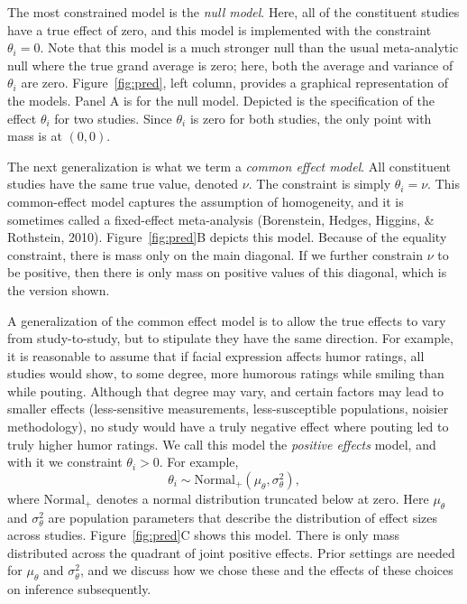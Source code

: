 \documentclass[english,man]{apa6}
\theoremstyle{definition}
\theoremstyle{definition}
\theoremstyle{definition}
\theoremstyle{remark}
\begin{document}
The most constrained model is the \emph{null model}. Here, all of the
constituent studies have a true effect of zero, and this model is
implemented with the constraint \(\theta_i=0\). Note that this model is
a much stronger null than the usual meta-analytic null where the true
grand average is zero; here, both the average and variance of
\(\theta_i\) are zero. Figure~\ref{fig:pred}, left column, provides a
graphical representation of the models. Panel A is for the null model.
Depicted is the specification of the effect \(\theta_i\) for two
studies. Since \(\theta_i\) is zero for both studies, the only point
with mass is at \((0,0)\).

The next generalization is what we term a \emph{common effect model}.
All constituent studies have the same true value, denoted \(\nu\). The
constraint is simply \(\theta_i=\nu\). This common-effect model captures
the assumption of homogeneity, and it is sometimes called a fixed-effect
meta-analysis (Borenstein, Hedges, Higgins, \& Rothstein, 2010).
Figure~\ref{fig:pred}B depicts this model. Because of the equality
constraint, there is mass only on the main diagonal. If we further
constrain \(\nu\) to be positive, then there is only mass on positive
values of this diagonal, which is the version shown.

A generalization of the common effect model is to allow the true effects
to vary from study-to-study, but to stipulate they have the same
direction. For example, it is reasonable to assume that if facial
expression affects humor ratings, all studies would show, to some
degree, more humorous ratings while smiling than while pouting. Although
that degree may vary, and certain factors may lead to smaller effects
(less-sensitive measurements, less-susceptible populations, noisier
methodology), no study would have a truly negative effect where pouting
led to truly higher humor ratings. We call this model the \emph{positive
effects} model, and with it we constraint \(\theta_i>0\). For example,
\[
\theta_i \sim \mbox{Normal}_+(\mu_\theta,\sigma^2_\theta),
\] where \(\mbox{Normal}_+\) denotes a normal distribution truncated
below at zero. Here \(\mu_\theta\) and \(\sigma^2_\theta\) are
population parameters that describe the distribution of effect sizes
across studies. Figure~\ref{fig:pred}C shows this model. There is only
mass distributed across the quadrant of joint positive effects. Prior
settings are needed for \(\mu_\theta\) and \(\sigma^2_\theta\), and we
discuss how we chose these and the effects of these choices on inference
subsequently.
\end{document}

